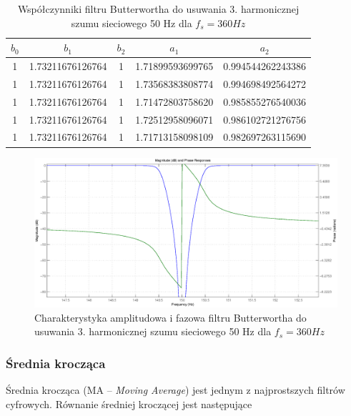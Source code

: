 \begin{table}[H]
\begin{center}
\begin{tabular}{|c|c|c|c|c|}
\hline
        $b_0$ & $b_1$ & $b_2$ & $a_1$ & $a_2$ \\
\hline
        1& 1.73211676126764& 1&        1.71899593699765& 0.994544262243386\\
\hline
        1& 1.73211676126764& 1&        1.73568383808774& 0.994698492564272\\
\hline
        1& 1.73211676126764& 1&        1.71472803758620& 0.985855276540036\\
\hline
        1& 1.73211676126764& 1&        1.72512958096071& 0.986102721276756\\
\hline
        1& 1.73211676126764& 1&        1.71713158098109& 0.982697263115690\\
\hline
\end{tabular} 
\caption{Współczynniki filtru Butterwortha do usuwania 3. harmonicznej szumu sieciowego 50 Hz dla $f_s=360 Hz$}
\label{tab:ac_3rd_360}
\end{center}
\end{table}

\begin{figure}[H]
\centering
	\includegraphics[width=\textwidth]{ECG_BASELINE/figures/3rd_harm_360.eps}
\caption{Charakterystyka amplitudowa i fazowa filtru Butterwortha do usuwania 3. harmonicznej szumu sieciowego 50 Hz dla $f_s=360 Hz$}
\label{fig:3rd_360}
\end{figure}

\subsubsection{Średnia krocząca}

Średnia krocząca (MA -- \emph{Moving Average}) jest jednym z najprostszych filtrów cyfrowych. Równanie średniej kroczącej jest następujące

